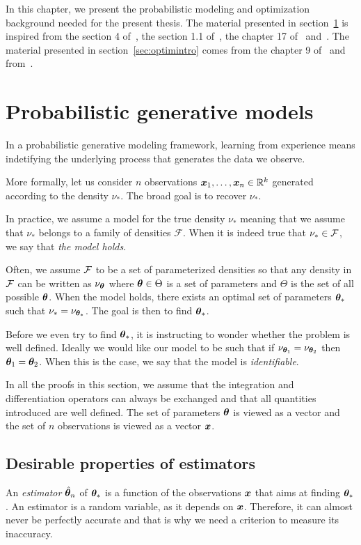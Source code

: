 In this chapter, we present the probabilistic modeling and
optimization background needed for the present thesis. The material presented in
section~\ref{sec:probgenmodel} is inspired
from the section 4 of~\cite{levy2012probabilistic}, the section 1.1
of~\cite{ablin2019exploration}, the chapter 17 of~\cite{ferguson2017course}
and~\cite{stein1956inadmissibility}. The material presented in
section~\ref{sec:optimintro} comes from the chapter 9 of~\cite{boyd2004convex}
and from~\cite{neal1998view}.

\section{Probabilistic generative models}
\label{sec:probgenmodel}
In a probabilistic generative modeling framework, learning from experience means indetifying the underlying process that generates the data we observe.

More formally, let us consider $n$ observations $\boldsymbol{x}_1, \dots, \boldsymbol{x}_n \in \mathbb{R}^k$ generated according to the density $\nu_*$.  The broad goal is to recover $\nu_*$.

In practice, we assume a model for the true density $\nu_*$ meaning that we
assume that $\nu_*$ belongs to a family of densities $\mathcal{F}$.
When it is indeed true that $\nu_* \in \mathcal{F}$, we say that \emph{the model holds}.

Often, we assume $\mathcal{F}$ to be a set of parameterized densities so
that any density in $\mathcal{F}$ can be written as $\nu_{\boldsymbol{\theta}}$ where
$\boldsymbol{\theta} \in \Theta$ is a set of parameters and $\Theta$ is the set of all
possible $\boldsymbol{\theta}$. When the model holds, there exists an optimal
set of parameters $\boldsymbol{\theta}_*$ such that $\nu_* = \nu_{\boldsymbol{\theta}_*}$. The goal is then
to find $\boldsymbol{\theta}_*$.


Before we even try to find $\boldsymbol{\theta}_*$, it is instructing to wonder whether the
problem is well defined. Ideally we would like our model to be such that if
$\nu_{\boldsymbol{\theta}_1} = \nu_{\boldsymbol{\theta}_2}$ then $\boldsymbol{\theta}_1=\boldsymbol{\theta}_2$.
When this is the case, we say that the model is \emph{identifiable}.

In all the proofs in this section, we assume that the integration and
differentiation operators can always be exchanged and that all quantities
introduced are well defined. The set of parameters $\boldsymbol{\theta}$ is viewed as a
vector and the set of $n$ observations is viewed as a vector $\boldsymbol{x}$.

\subsection{Desirable properties of estimators}
\label{sec:desirable}
An \emph{estimator} $\hat{\boldsymbol{\theta}}_n$ of $\boldsymbol{\theta}_*$ is a function of the
observations $\boldsymbol{x}$ that aims at finding $\boldsymbol{\theta}_*$.
An estimator is a random variable, as it depends on $\boldsymbol{x}$. Therefore, it can almost never be perfectly accurate and that
is why we need a criterion to measure its inaccuracy.

